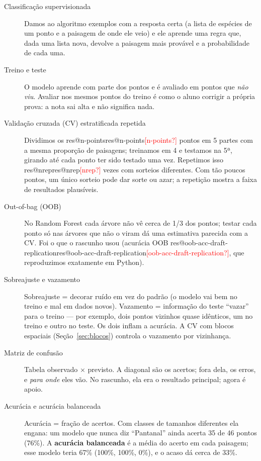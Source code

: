 \documentclass[11pt,a4paper]{article}
\makeatletter
\newcommand{\res}[1]{\ifcsname res@#1\endcsname\csname res@#1\endcsname\else\textcolor{red}{[#1?]}\fi}
\makeatother
\begin{document}
\begin{description}
\item[Classificação supervisionada] Damos ao algoritmo exemplos com a resposta certa (a lista de
espécies de um ponto e a paisagem de onde ele veio) e ele aprende uma regra que, dada uma lista
nova, devolve a paisagem mais provável e a probabilidade de cada uma.

\item[Treino e teste] O modelo aprende com parte dos pontos e é avaliado em pontos que
\emph{não viu}. Avaliar nos mesmos pontos do treino é como o aluno corrigir a própria prova: a
nota sai alta e não significa nada.

\item[Validação cruzada (CV) estratificada repetida] Dividimos os \res{n-points} pontos em 5 partes
com a mesma proporção de paisagens; treinamos em 4 e testamos na 5ª, girando até cada ponto ter
sido testado uma vez. Repetimos isso \res{nrep} vezes com sorteios diferentes. Com tão poucos pontos,
um único sorteio pode dar sorte ou azar; a repetição mostra a faixa de resultados plausíveis.

\item[Out-of-bag (OOB)] No Random Forest cada árvore não vê cerca de 1/3 dos pontos; testar cada
ponto só nas árvores que não o viram dá uma estimativa parecida com a CV. Foi o que o rascunho usou
(acurácia OOB \res{oob-acc-draft-replication}, que reproduzimos exatamente em Python).

\item[Sobreajuste e vazamento] Sobreajuste = decorar ruído em vez do padrão (o modelo vai bem no
treino e mal em dados novos). Vazamento = informação do teste ``vazar'' para o treino --- por
exemplo, dois pontos vizinhos quase idênticos, um no treino e outro no teste. Os dois inflam a
acurácia. A CV com blocos espaciais (Seção~\ref{sec:blocos}) controla o vazamento por vizinhança.

\item[Matriz de confusão] Tabela observado $\times$ previsto. A diagonal são os acertos; fora dela,
os erros, e \emph{para onde} eles vão. No rascunho, ela era o resultado principal; agora é apoio.

\item[Acurácia e acurácia balanceada] Acurácia = fração de acertos. Com classes de tamanhos
diferentes ela engana: um modelo que nunca diz ``Pantanal'' ainda acerta 35 de 46 pontos (76\%).
A \textbf{acurácia balanceada} é a média do acerto em cada paisagem; esse modelo teria 67\% (100\%,
100\%, 0\%), e o acaso dá cerca de 33\%.


\end{description}
\end{document}
